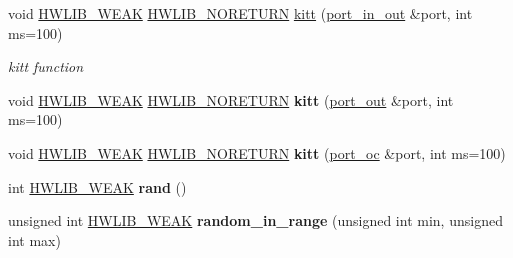 \begin{DoxyCompactItemize}
void \hyperlink{hwlib-defines_8hpp_a04be4340016df60d6636c1d1c6d94fc9}{H\+W\+L\+I\+B\+\_\+\+W\+E\+AK} \hyperlink{hwlib-defines_8hpp_aef311f1f416fdcbd1fa22376dcc01029}{H\+W\+L\+I\+B\+\_\+\+N\+O\+R\+E\+T\+U\+RN} \hyperlink{namespacehwlib_af01d061e28150ea14c1e9d01183792d3}{kitt} (\hyperlink{classhwlib_1_1port__in__out}{port\+\_\+in\+\_\+out} \&port, int ms=100)
\begin{DoxyCompactList}\small\item\em kitt function \end{DoxyCompactList}\item 
void \hyperlink{hwlib-defines_8hpp_a04be4340016df60d6636c1d1c6d94fc9}{H\+W\+L\+I\+B\+\_\+\+W\+E\+AK} \hyperlink{hwlib-defines_8hpp_aef311f1f416fdcbd1fa22376dcc01029}{H\+W\+L\+I\+B\+\_\+\+N\+O\+R\+E\+T\+U\+RN} {\bfseries kitt} (\hyperlink{classhwlib_1_1port__out}{port\+\_\+out} \&port, int ms=100)\hypertarget{namespacehwlib_afe638539acc989325624e978e3d1f329}{}\label{namespacehwlib_afe638539acc989325624e978e3d1f329}

\item 
void \hyperlink{hwlib-defines_8hpp_a04be4340016df60d6636c1d1c6d94fc9}{H\+W\+L\+I\+B\+\_\+\+W\+E\+AK} \hyperlink{hwlib-defines_8hpp_aef311f1f416fdcbd1fa22376dcc01029}{H\+W\+L\+I\+B\+\_\+\+N\+O\+R\+E\+T\+U\+RN} {\bfseries kitt} (\hyperlink{classhwlib_1_1port__oc}{port\+\_\+oc} \&port, int ms=100)\hypertarget{namespacehwlib_aa809d974c66cb1552aae0ae0fee7bb36}{}\label{namespacehwlib_aa809d974c66cb1552aae0ae0fee7bb36}

\item 
int \hyperlink{hwlib-defines_8hpp_a04be4340016df60d6636c1d1c6d94fc9}{H\+W\+L\+I\+B\+\_\+\+W\+E\+AK} {\bfseries rand} ()\hypertarget{namespacehwlib_a9036fd0378141680d2e2a1b4a4eb52c9}{}\label{namespacehwlib_a9036fd0378141680d2e2a1b4a4eb52c9}

\item 
unsigned int \hyperlink{hwlib-defines_8hpp_a04be4340016df60d6636c1d1c6d94fc9}{H\+W\+L\+I\+B\+\_\+\+W\+E\+AK} {\bfseries random\+\_\+in\+\_\+range} (unsigned int min, unsigned int max)\hypertarget{namespacehwlib_a0b714101e3779c837076fdc3bc6017bf}{}\label{namespacehwlib_a0b714101e3779c837076fdc3bc6017bf}


\end{DoxyCompactItemize}
